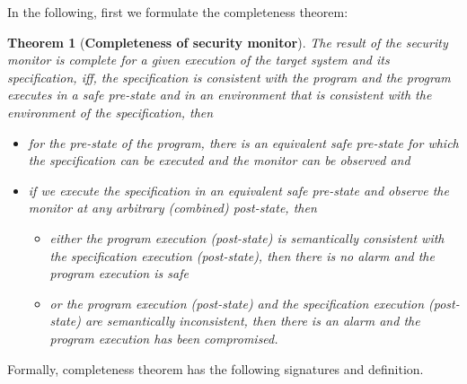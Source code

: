 \documentclass[conference]{IEEEtran}
\newtheorem{thm}{Theorem}
\begin{document}
In the following, first we formulate the completeness theorem:

\begin{thm}[\textbf{Completeness of security monitor}]\label{completeness} 
The result of the security monitor is complete for a given execution of the target system and its specification, iff, the specification is consistent with the program and the program executes in a safe pre-state and in an environment that is consistent with the environment of the specification, then 
\begin{itemize}
\item for the pre-state of the program, there is an equivalent safe pre-state for which the specification can be executed and the monitor can be observed and
\item if we execute the specification in an equivalent safe pre-state and observe the monitor at any arbitrary (combined) post-state, then 
\begin{itemize}
\item either the program execution (post-state) is semantically consistent with the specification execution (post-state), then there is no alarm and the program execution is safe
\item or the program execution (post-state) and the specification execution (post-state) are semantically inconsistent, then there is an alarm and the program execution has been compromised.
\end{itemize} 
\end{itemize}
\end{thm}



Formally, completeness theorem has the following signatures and definition.
\end{document}
